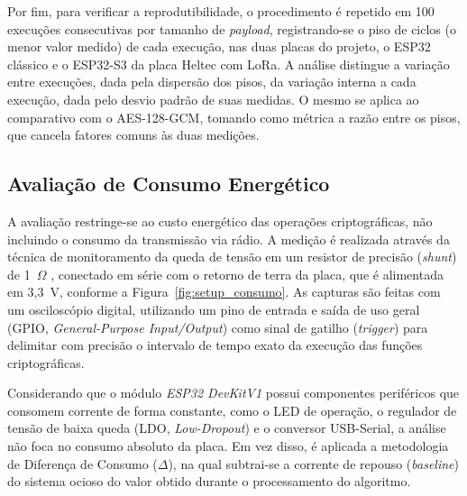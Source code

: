 Por fim, para verificar a reprodutibilidade, o procedimento é repetido em 100 execuções consecutivas por tamanho de \textit{payload}, registrando-se o piso de ciclos (o menor valor medido) de cada execução, nas duas placas do projeto, o ESP32 clássico e o ESP32-S3 da placa Heltec com LoRa. A análise distingue a variação entre execuções, dada pela dispersão dos pisos, da variação interna a cada execução, dada pelo desvio padrão de suas medidas. O mesmo se aplica ao comparativo com o AES-128-GCM, tomando como métrica a razão entre os pisos, que cancela fatores comuns às duas medições.


\subsection{Avaliação de Consumo Energético}
\label{subsec:energia_metodo}
A avaliação restringe-se ao custo energético das operações criptográficas, não incluindo o consumo da transmissão via rádio. A medição é realizada através da técnica de monitoramento da queda de tensão em um resistor de precisão (\textit{shunt}) de 1~$\Omega$ \cite{hubble2024esp32power}, conectado em série com o retorno de terra da placa, que é alimentada em 3,3~V, conforme a Figura~\ref{fig:setup_consumo}. As capturas são feitas com um osciloscópio digital, utilizando um pino de entrada e saída de uso geral (GPIO, \textit{General-Purpose Input/Output}) como sinal de gatilho (\textit{trigger}) para delimitar com precisão o intervalo de tempo exato da execução das funções criptográficas.

Considerando que o módulo \textit{ESP32 DevKitV1} possui componentes periféricos que consomem corrente de forma constante, como o LED de operação, o regulador de tensão de baixa queda (LDO, \textit{Low-Dropout}) e o conversor USB-Serial, a análise não foca no consumo absoluto da placa. Em vez disso, é aplicada a metodologia de Diferença de Consumo ($\Delta$), na qual subtrai-se a corrente de repouso (\textit{baseline}) do sistema ocioso do valor obtido durante o processamento do algoritmo.

